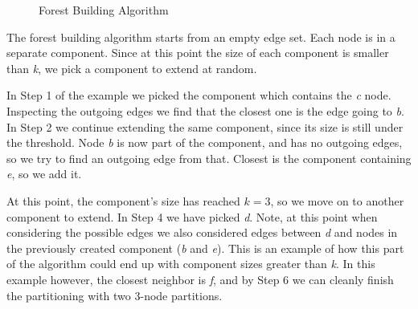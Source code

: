\begin{figure}
	\vspace{0.6cm}
	\vspace{0.6cm}
    \caption{Forest Building Algorithm}
    \label{fig:forest_partitioning}
\end{figure}

The forest building algorithm starts from an empty edge set. Each node is in a separate component. Since at this point the size of each component is smaller than \textit{k}, we pick a component to extend at random.

In Step 1 of the example we picked the component which contains the \textit{c} node. Inspecting the outgoing edges we find that the closest one is the edge going to \textit{b}. In Step 2 we continue extending the same component, since its size is still under the threshold. Node \textit{b} is now part of the component, and has no outgoing edges, so we try to find an outgoing edge from that. Closest is the component containing \textit{e}, so we add it.

At this point, the component's size has reached \(k=3\), so we move on to another component to extend. In Step 4 we have picked \textit{d}. Note, at this point when considering the possible edges we also considered edges between \textit{d} and nodes in the previously created component (\textit{b} and \textit{e}). This is an example of how this part of the algorithm could end up with component sizes greater than \textit{k}. In this example however, the closest neighbor is \textit{f}, and by Step 6 we can cleanly finish the partitioning with two 3-node partitions.

